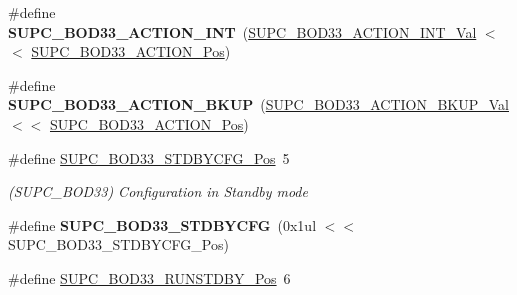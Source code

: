 \begin{DoxyCompactItemize}
\item 
\hypertarget{group___s_a_m_l21___s_u_p_c_ga9f48e763543d9afd1d38e110681ff4b9}{}\#define {\bfseries S\+U\+P\+C\+\_\+\+B\+O\+D33\+\_\+\+A\+C\+T\+I\+O\+N\+\_\+\+I\+N\+T}~(\hyperlink{group___s_a_m_l21___s_u_p_c_ga233a44ba6e1e663e692832cf2bb74afe}{S\+U\+P\+C\+\_\+\+B\+O\+D33\+\_\+\+A\+C\+T\+I\+O\+N\+\_\+\+I\+N\+T\+\_\+\+Val}     $<$$<$ \hyperlink{group___s_a_m_l21___s_u_p_c_ga8e1dbd232c21c8618d6ee2ea49c093ad}{S\+U\+P\+C\+\_\+\+B\+O\+D33\+\_\+\+A\+C\+T\+I\+O\+N\+\_\+\+Pos})\label{group___s_a_m_l21___s_u_p_c_ga9f48e763543d9afd1d38e110681ff4b9}

\item 
\hypertarget{group___s_a_m_l21___s_u_p_c_gaa015886bf61e5cf5a82621ec55436124}{}\#define {\bfseries S\+U\+P\+C\+\_\+\+B\+O\+D33\+\_\+\+A\+C\+T\+I\+O\+N\+\_\+\+B\+K\+U\+P}~(\hyperlink{group___s_a_m_l21___s_u_p_c_ga154a98779bef7cb80f43330e6d981d1a}{S\+U\+P\+C\+\_\+\+B\+O\+D33\+\_\+\+A\+C\+T\+I\+O\+N\+\_\+\+B\+K\+U\+P\+\_\+\+Val}    $<$$<$ \hyperlink{group___s_a_m_l21___s_u_p_c_ga8e1dbd232c21c8618d6ee2ea49c093ad}{S\+U\+P\+C\+\_\+\+B\+O\+D33\+\_\+\+A\+C\+T\+I\+O\+N\+\_\+\+Pos})\label{group___s_a_m_l21___s_u_p_c_gaa015886bf61e5cf5a82621ec55436124}

\item 
\hypertarget{group___s_a_m_l21___s_u_p_c_ga4a8dff4a124b3db4f0fc4d1278ed6359}{}\#define \hyperlink{group___s_a_m_l21___s_u_p_c_ga4a8dff4a124b3db4f0fc4d1278ed6359}{S\+U\+P\+C\+\_\+\+B\+O\+D33\+\_\+\+S\+T\+D\+B\+Y\+C\+F\+G\+\_\+\+Pos}~5\label{group___s_a_m_l21___s_u_p_c_ga4a8dff4a124b3db4f0fc4d1278ed6359}

\begin{DoxyCompactList}\small\item\em (S\+U\+P\+C\+\_\+\+B\+O\+D33) Configuration in Standby mode \end{DoxyCompactList}\item 
\hypertarget{group___s_a_m_l21___s_u_p_c_gaec0339fce1e4f251d81fd8890baea187}{}\#define {\bfseries S\+U\+P\+C\+\_\+\+B\+O\+D33\+\_\+\+S\+T\+D\+B\+Y\+C\+F\+G}~(0x1ul $<$$<$ S\+U\+P\+C\+\_\+\+B\+O\+D33\+\_\+\+S\+T\+D\+B\+Y\+C\+F\+G\+\_\+\+Pos)\label{group___s_a_m_l21___s_u_p_c_gaec0339fce1e4f251d81fd8890baea187}

\item 
\hypertarget{group___s_a_m_l21___s_u_p_c_ga01cbe9b7d7833fa8ca247b4527ecbde8}{}\#define \hyperlink{group___s_a_m_l21___s_u_p_c_ga01cbe9b7d7833fa8ca247b4527ecbde8}{S\+U\+P\+C\+\_\+\+B\+O\+D33\+\_\+\+R\+U\+N\+S\+T\+D\+B\+Y\+\_\+\+Pos}~6\label{group___s_a_m_l21___s_u_p_c_ga01cbe9b7d7833fa8ca247b4527ecbde8}


\end{DoxyCompactItemize}
